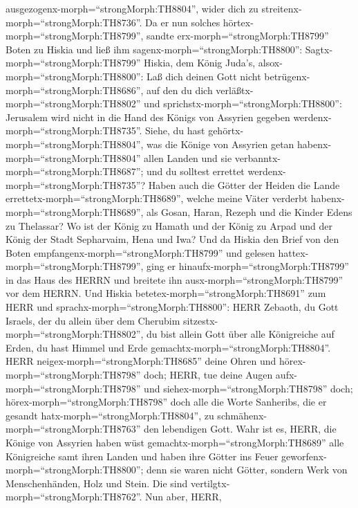 ausgezogenx-morph=``strongMorph:TH8804'', wider dich zu
streitenx-morph=``strongMorph:TH8736''.  Da er nun solches
hörtex-morph=``strongMorph:TH8799'', sandte
erx-morph=``strongMorph:TH8799'' Boten zu Hiskia und ließ ihm
sagenx-morph=``strongMorph:TH8800'': Sagtx-morph=``strongMorph:TH8799''
Hiskia, dem König Juda's, alsox-morph=``strongMorph:TH8800'': Laß dich
deinen Gott nicht betrügenx-morph=``strongMorph:TH8686'', auf den du
dich verläßtx-morph=``strongMorph:TH8802'' und
sprichstx-morph=``strongMorph:TH8800'': Jerusalem wird nicht in die Hand
des Königs von Assyrien gegeben werdenx-morph=``strongMorph:TH8735''.
 Siehe, du hast gehörtx-morph=``strongMorph:TH8804'', was
die Könige von Assyrien getan habenx-morph=``strongMorph:TH8804'' allen
Landen und sie verbanntx-morph=``strongMorph:TH8687''; und du solltest
errettet werdenx-morph=``strongMorph:TH8735''?  Haben auch
die Götter der Heiden die Lande errettetx-morph=``strongMorph:TH8689'',
welche meine Väter verderbt habenx-morph=``strongMorph:TH8689'', als
Gosan, Haran, Rezeph und die Kinder Edens zu Thelassar?  Wo
ist der König zu Hamath und der König zu Arpad und der König der Stadt
Sepharvaim, Hena und Iwa?  Und da Hiskia den Brief von den
Boten empfangenx-morph=``strongMorph:TH8799'' und gelesen
hattex-morph=``strongMorph:TH8799'', ging er
hinaufx-morph=``strongMorph:TH8799'' in das Haus des HERRN und breitete
ihn ausx-morph=``strongMorph:TH8799'' vor dem HERRN.  Und
Hiskia betetex-morph=``strongMorph:TH8691'' zum HERR und
sprachx-morph=``strongMorph:TH8800'':  HERR Zebaoth, du
Gott Israels, der du allein über dem Cherubim
sitzestx-morph=``strongMorph:TH8802'', du bist allein Gott über alle
Königreiche auf Erden, du hast Himmel und Erde
gemachtx-morph=``strongMorph:TH8804''.  HERR
neigex-morph=``strongMorph:TH8685'' deine Ohren und
hörex-morph=``strongMorph:TH8798'' doch; HERR, tue deine Augen
aufx-morph=``strongMorph:TH8798'' und
siehex-morph=``strongMorph:TH8798'' doch;
hörex-morph=``strongMorph:TH8798'' doch alle die Worte Sanheribs, die er
gesandt hatx-morph=``strongMorph:TH8804'', zu
schmähenx-morph=``strongMorph:TH8763'' den lebendigen Gott.
 Wahr ist es, HERR, die Könige von Assyrien haben wüst
gemachtx-morph=``strongMorph:TH8689'' alle Königreiche samt ihren Landen
 und haben ihre Götter ins Feuer
geworfenx-morph=``strongMorph:TH8800''; denn sie waren nicht Götter,
sondern Werk von Menschenhänden, Holz und Stein. Die sind
vertilgtx-morph=``strongMorph:TH8762''.  Nun aber, HERR,
